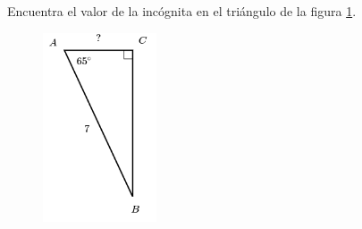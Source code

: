 \question[15]  Encuentra el valor de la incógnita en el triángulo de la figura \ref{fig:lados_functrig_12}.
\begin{figure}[H]
    \begin{center}
        \includegraphics[width=0.3\textwidth]{../images/lados_functrig_12.png}
    \end{center}
    \caption{}
    \label{fig:lados_functrig_12}
\end{figure}